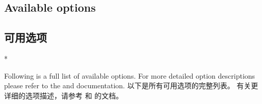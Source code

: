 \begin{paracol}{2}
\subsection{Available options}
\switchcolumn
\subsection{可用选项}
\switchcolumn[0]*%


Following is a full list of available options.
For more detailed option descriptions please refer to the  and  documentation.
\switchcolumn
以下是所有可用选项的完整列表。
有关更详细的选项描述，请参考  和  的文档。
\end{paracol}